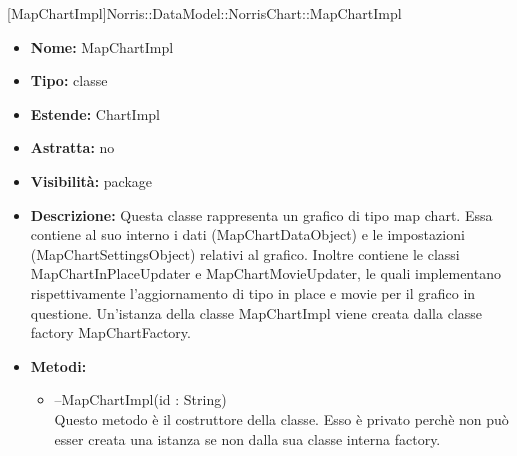 			
			[MapChartImpl]{Norris::DataModel::NorrisChart::MapChartImpl}
			

	
			
			\begin{itemize}
			\item \textbf{Nome:} MapChartImpl
			\item \textbf{Tipo:} classe
			
		\item \textbf{Estende:}
		ChartImpl
		\item \textbf{Astratta:}
		no
			\item \textbf{Visibilità:} package
			\item \textbf{Descrizione:} Questa classe rappresenta un grafico di tipo map chart. Essa contiene al suo interno i dati (MapChartDataObject) e le impostazioni (MapChartSettingsObject) relativi al grafico. Inoltre contiene le classi MapChartInPlaceUpdater e MapChartMovieUpdater, le quali implementano rispettivamente l'aggiornamento di tipo in place e movie per il grafico in questione. Un'istanza della classe MapChartImpl viene creata dalla classe factory MapChartFactory.
			\item \textbf{Metodi:}
				\begin{itemize}
				\setlength{\itemsep}{5pt}
				
					\item[\ding{111}] {{--MapChartImpl(id : String)}} \\ [1mm] Questo metodo è il costruttore della classe. Esso è privato perchè non può esser creata una istanza se non dalla sua classe interna factory.
				\end{itemize}
		
			\end{itemize}

